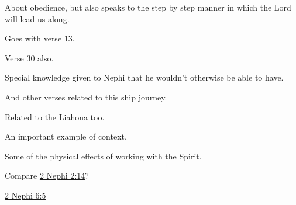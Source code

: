 \begin{compactdesc}
\begin{compactitem}
				\end{compactitem}
			\item[{\hyperref[1NEPHI-17-3]{1 Nephi 17:3}}] \phantom{.}
				\begin{compactitem}
					\item About obedience, but also speaks to the step by step manner in which the Lord will lead us along.
					\item Goes with verse 13.
					\item Verse 30 also.
				\end{compactitem}
			\item[{\hyperref[1NEPHI-17-8]{1 Nephi 17:8}}] \phantom{.}
				\begin{compactitem}
					\item Special knowledge given to Nephi that he wouldn't otherwise be able to have.
				\end{compactitem}
			\item[{\hyperref[1NEPHI-17-13]{1 Nephi 17:13}}]
			\item[{\hyperref[1NEPHI-17-45]{1 Nephi 17:45}}]
			\item[{\hyperref[1NEPHI-18-1]{1 Nephi 18:1--3}}]
			\item[{\hyperref[1NEPHI-18-12]{1 Nephi 18:12--13}}] \phantom{.}
				\begin{compactitem}
					\item And other verses related to this ship journey.
					\item Related to the Liahona too.
				\end{compactitem}
			\item[{\hyperref[1NEPHI-19-12]{1 Nephi 19:12}}] \phantom{.}
				\begin{compactitem}
					\item An important example of context.
				\end{compactitem}
			\item[{\hyperref[1NEPHI-19-20]{1 Nephi 19:20}}] \phantom{.}
				\begin{compactitem}
					\item Some of the physical effects of working with the Spirit.
				\end{compactitem}
			\item[{\hyperref[1NEPHI-19-22]{1 Nephi 19:22--24}}] \phantom{.}
				\begin{compactitem}
					\item Compare \hyperref[2NEPHI-2-14]{2 Nephi 2:14}?
					\item \hyperref[2NEPHI-6-5]{2 Nephi 6:5}

\end{compactitem}
\end{compactdesc}
